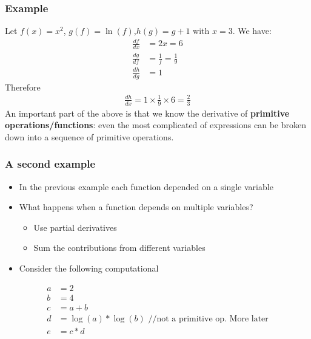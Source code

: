 \documentclass{beamer}
\theoremstyle{plain} %
\theoremstyle{example} %
\begin{document}
\begin{frame}
    \frametitle{Example}
    Let $f(x)=x^2$, $g(f)=\ln(f)$,$h(g)=g+1$ with $x=3$. We have:
    \begin{align*}
        \frac{df}{dx}&=2x=6\\
        \frac{dg}{df}&=\frac{1}{f}=\frac{1}{9}\\
        \frac{dh}{dg}&=1
    \end{align*}
  Therefore
  \begin{align*}
    \frac{dh}{dx}=1\times\frac{1}{9}\times 6=\frac{2}{3}
  \end{align*}  
An important part of the above is that we know the derivative of \textbf{primitive operations/functions}: even the most complicated of expressions can be broken down into a sequence of primitive operations.
\end{frame}
\begin{frame}
    \frametitle{A second example}
    \begin{itemize}
        \item In the previous example each function depended on a single variable
        \item What happens when a function depends on multiple variables?
        \begin{itemize}
            \item Use partial derivatives
            \item Sum the contributions from different variables
        \end{itemize}
        \item Consider the following computational
    \end{itemize}
   
\begin{align*}
    a&=2\\
    b&=4\\
    c&=a+b\\
    d&=\log(a)*\log(b) \text{  //not a primitive op. More later}\\
    e&=c*d
\end{align*}    

\end{frame}
\end{document}
